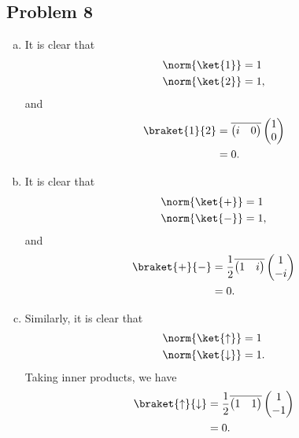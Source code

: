 \documentclass[10pt]{mypackage}
\begin{document}
\subsection{Problem 8}%
\begin{enumerate}[(a)]
  \item It is clear that
    \begin{align*}
      \norm{\ket{1}} &= 1\\
      \norm{\ket{2}} &= 1,
    \end{align*}
    and
    \begin{align*}
      \braket{1}{2} &= \overline{ \begin{pmatrix}i & 0\end{pmatrix} } \begin{pmatrix}1\\0\end{pmatrix}\\
                    &= 0.
    \end{align*}
  \item It is clear that
    \begin{align*}
      \norm{\ket{+}} &= 1\\
      \norm{\ket{-}} &= 1,
    \end{align*}
    and
    \begin{align*}
      \braket{+}{-} &= \frac{1}{2} \overline{ \begin{pmatrix}1 & i\end{pmatrix} } \begin{pmatrix}1\\-i\end{pmatrix}\\
                    &=0.
    \end{align*}
  \item Similarly, it is clear that
    \begin{align*}
      \norm{\ket{\uparrow}} &= 1\\
      \norm{\ket{\downarrow}} &= 1.
    \end{align*}
    Taking inner products, we have
    \begin{align*}
      \braket{\uparrow}{\downarrow} &= \frac{1}{2} \overline{ \begin{pmatrix}1 & 1\end{pmatrix} } \begin{pmatrix}1\\-1\end{pmatrix}\\
                                    &= 0.

\end{align*}
\end{enumerate}
\end{document}
